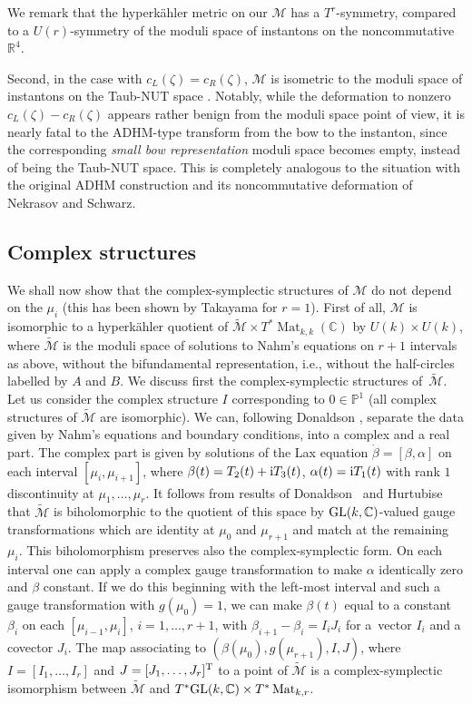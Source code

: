 \documentclass[pdftex]{sigma}
\newcommand{\cx}{{\mathbb C}}
\newcommand{\Mat}{\operatorname{Mat}}
\numberwithin{equation}{section}
\newcommand{\oP}{{\mathbb{P}}}
\newcommand{\sM}{{\mathcal{M}}} %
\begin{document}
{We remark that the hyperk\"ahler metric on our $\sM$ has a $T^r$-symmetry, compared to a $U(r)$-symmetry of the moduli space of instantons on the noncommutative $\mathbb{R}^4.$

Second, in the case with $c_L(\zeta)=c_R(\zeta)$, $\sM$ is isometric to the moduli space of instantons on the Taub-NUT space \cite{CLHS}. Notably, while the deformation to nonzero $c_L(\zeta)-c_R(\zeta)$ appears rather benign from the moduli space point of view, it is nearly fatal to the ADHM-type transform from the bow to the instanton, since the corresponding {\em small bow representation} moduli space becomes empty, instead of being the Taub-NUT space. This is completely analogous to the situation with the original ADHM construction and its noncommutative deformation of Nekrasov and Schwarz.

\subsection{Complex structures\label{complex}}
We shall now show that the complex-symplectic structures of $\sM$ do not depend on the $\mu_i$ (this has been shown by Takayama for $r=1$). First of all, $\sM$ is isomorphic to a hyperk\"ahler quotient of $\tilde \sM\times T^\ast \Mat_{k,k}(\cx)$ by $U(k)\times U(k)$, where $\tilde\sM$ is the moduli space of solutions to Nahm's equations on $r+1$ intervals as above, without the bifundamental representation, i.e., without the half-circles labelled by $A$ and $B$. We discuss first the complex-symplectic structures of~$\tilde\sM$. Let us consider the complex structure $I$ corresponding to $0\in \oP^1$ (all complex structures of $\tilde\sM$ are isomorphic). We can, following Donaldson \cite{Don}, separate the data given by Nahm's equations and boundary conditions, into a complex and a real part.
The complex part is given by solutions of the Lax equation $\dot\beta=[\beta,\alpha]$ on each interval {$[\mu_i,\mu_{i+1}]$}, where $\beta(t)=T_2(t)+{\rm i} T_3(t)$, $\alpha(t)={\rm i} T_1(t)$ with rank $1$ discontinuity at $\mu_1,\dots,\mu_r$.
It follows from results of Donaldson~\cite{Don} and Hurtubise~\cite{Hurt} that $\tilde\sM$ is biholomorphic to the quotient of this space by ${\rm GL}(k,\cx)$-valued gauge transformations which are identity at $\mu_0$ and $\mu_{r+1}$ and match at the remaining~$\mu_i$.
This biholomorphism preserves also the complex-symplectic form.
On each interval one can apply a complex gauge transformation to make $\alpha$ identically zero and $\beta$ constant. If we do this
beginning with the left-most interval and such a gauge transformation with $g(\mu_0)=1$, we can make $\beta(t)$ equal to a constant $\beta_i$ on each $[\mu_{i-1},\mu_i]$, $i=1,\dots, r+1$, with $\beta_{i+1}-\beta_i=I_iJ_i$ for a~vector $I_i$ and a covector $J_i$. The map associating to $(\beta(\mu_0),g(\mu_{r+1}), I,J)$, where $I=[I_1,\dots,I_r]$ and $J=[J_1,\dots, J_r]^{\rm T}$ to a point of $\tilde\sM$ is a complex-symplectic isomorphism between $\tilde\sM$ and $T^\ast {\rm GL}(k,\cx)\times T^\ast\Mat_{k,r}$.

}
\end{document}
